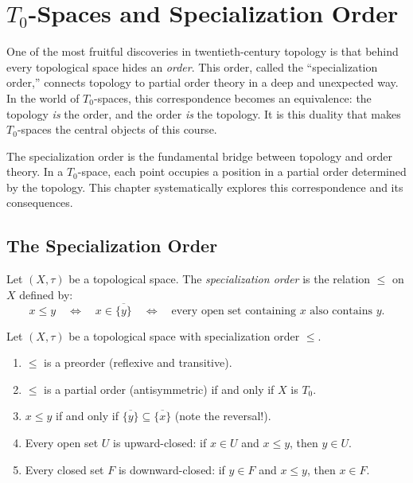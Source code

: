 \chapter{$T_0$-Spaces and Specialization Order}
\label{ch:t0_specialization}

One of the most fruitful discoveries in twentieth-century topology is that
behind every topological space hides an \emph{order}. This order, called the
``specialization order,'' connects topology to partial order theory in a
deep and unexpected way. In the world of $T_0$-spaces, this correspondence
becomes an equivalence: the topology \emph{is} the order, and the order
\emph{is} the topology. It is this duality that makes $T_0$-spaces the
central objects of this course.

\begin{intuition}
The specialization order is the fundamental bridge between topology and order theory. In a
$T_0$-space, each point occupies a position in a partial order determined by the topology.
This chapter systematically explores this correspondence and its consequences.
\end{intuition}

\section{The Specialization Order}

\begin{definition}
Let $(X,\tau)$ be a topological space. The \emph{specialization order} is the relation
$\leq$ on $X$ defined by:
\[
  x \leq y \quad \Longleftrightarrow \quad x \in \overline{\{y\}}
  \quad \Longleftrightarrow \quad \text{every open set containing } x
  \text{ also contains } y.
\]
\end{definition}

\begin{proposition}
Let $(X,\tau)$ be a topological space with specialization order $\leq$.
\begin{enumerate}
  \item $\leq$ is a preorder (reflexive and transitive).
  \item $\leq$ is a partial order (antisymmetric) if and only if $X$ is $T_0$.
  \item $x \leq y$ if and only if $\overline{\{y\}} \subseteq \overline{\{x\}}$
    (note the reversal!).
  \item Every open set $U$ is upward-closed: if $x \in U$ and $x \leq y$, then $y \in U$.
  \item Every closed set $F$ is downward-closed: if $y \in F$ and $x \leq y$, then
    $x \in F$.
\end{enumerate}
\end{proposition}

